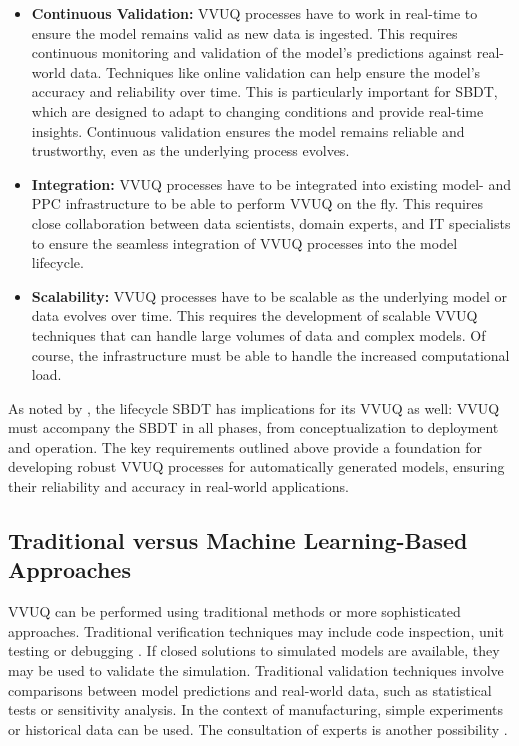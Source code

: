 \begin{itemize}
  \item \textbf{Continuous Validation:} VVUQ processes have to work in real-time to ensure the model remains valid as new data is ingested. This requires continuous monitoring and validation of the model's predictions against real-world data. Techniques like online validation \autocite{francis2021towards} can help ensure the model's accuracy and reliability over time. This is particularly important for SBDT, which are designed to adapt to changing conditions and provide real-time insights. Continuous validation ensures the model remains reliable and trustworthy, even as the underlying process evolves.
  \item \textbf{Integration:} VVUQ processes have to be integrated into existing model- and PPC infrastructure to be able to perform VVUQ on the fly. This requires close collaboration between data scientists, domain experts, and IT specialists to ensure the seamless integration of VVUQ processes into the model lifecycle.
  \item \textbf{Scalability:} VVUQ processes have to be scalable as the underlying model or data evolves over time. This requires the development of scalable VVUQ techniques that can handle large volumes of data and complex models. Of course, the infrastructure must be able to handle the increased computational load.
\end{itemize}

As noted by \citeauthor{francis2021towards}, the lifecycle SBDT has implications for its VVUQ as well: VVUQ must accompany the SBDT in all phases, from conceptualization to deployment and operation. The key requirements outlined above provide a foundation for developing robust VVUQ processes for automatically generated models, ensuring their reliability and accuracy in real-world applications.

\subsection{Traditional versus Machine Learning-Based Approaches}
\label{sec:ml-approaches}

VVUQ can be performed using traditional methods or more sophisticated approaches. Traditional verification techniques may include code inspection, unit testing or debugging \autocite{maniaci2018verification}. If closed solutions to simulated models are available, they may be used to validate the simulation. Traditional validation techniques involve comparisons between model predictions and real-world data, such as statistical tests or sensitivity analysis. In the context of manufacturing, simple experiments or historical data can be used. The consultation of experts is another possibility \parencite{shao2023credibility}.


